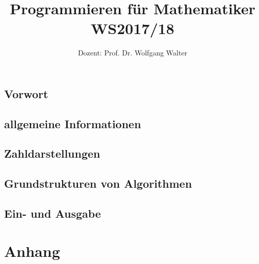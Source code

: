 \documentclass[ngerman,a4paper,order=firstname]{../../texmf/tex/latex/mathscript/mathscript}
\title{\textbf{Programmieren für Mathematiker WS2017/18}}
\author{Dozent: Prof. Dr. Wolfgang Walter}
\begin{document}
\pagestyle{plain}

\maketitle

\hypertarget{tocpage}{}
\tableofcontents
{}

\pagebreak
{}
\pagestyle{fancy}

\chapter*{Vorwort}


\chapter{allgemeine Informationen}


\chapter{Zahldarstellungen}





\chapter{Grundstrukturen von Algorithmen}







\chapter{Ein- und Ausgabe}



\part*{Anhang}
\appendix


\printindex
\end{document}
